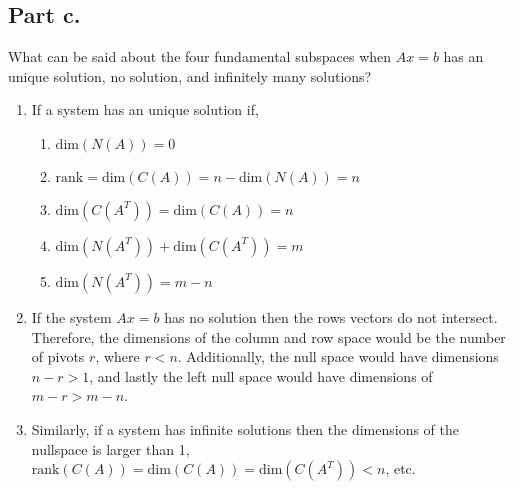 \subsection{Part c.}
What can be said about the four fundamental subspaces when $Ax=b$ has an
unique solution, no solution, and infinitely many solutions?
\begin{mdframed}[style=MyFrame]
    \begin{enumerate}[label=(\alph*)]
        \item If a system has an unique solution if, 
            \begin{enumerate}[label=(\arabic*)]
                \item $\text{dim}(N(A)) = 0$
                \item $\text{rank} = \text{dim}(C(A))=n-\text{dim}(N(A)) =
                    n$
                \item $\text{dim}(C(A^{T})) = \text{dim}(C(A)) = n $
                \item $\text{dim}(N(A^{T})) + \text{dim}(C(A^T)) = m$
                \item $\text{dim}(N(A^{T}))=m-n$
            \end{enumerate}
            
        \item If the system $Ax=b$ has no solution then the rows vectors do
            not intersect. Therefore, the dimensions of the column and row
            space would be the number of pivots $r$, where $r<n$.
            Additionally,  the null space would have dimensions $n-r>1$,
            and lastly the left null space would have dimensions of
            $m-r>m-n$. 
            
        \item Similarly, if a system has infinite solutions then the
            dimensions of the nullspace is larger than 1,
            $\text{rank}(C(A))=\text{dim}(C(A))=\text{dim}(C(A^{T}))<n$,
            etc.
    \end{enumerate}
\end{mdframed}

